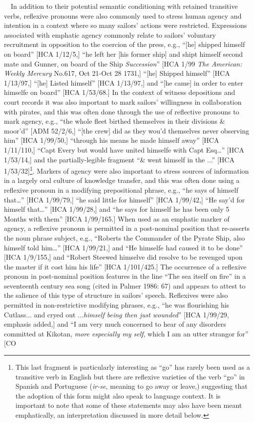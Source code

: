 \documentclass[12pt]{article}
\newenvironment{styleStandard}{\renewcommand\baselinestretch{1.0}\setlength\leftskip{0cm}\setlength\rightskip{0cm plus 1fil}\setlength\parindent{0cm}\setlength\parfillskip{0pt plus 1fil}\setlength\parskip{0in plus 1pt}\writerlistparindent\writerlistleftskip\leavevmode\normalfont\normalsize\writerlistlabel\ignorespaces}{\unskip\vspace{0in plus 1pt}\par}
\newcommand\writerlistleftskip{}
\newcommand\writerlistparindent{}
\newcommand\writerlistlabel{}
\begin{document}
\begin{styleStandard}
\ \ In addition to their potential semantic conditioning with retained transitive verbs, reflexive pronouns were also commonly used to stress human agency and intention in a context where so many sailors’ actions were restricted. Expressions associated with emphatic agency commonly relate to sailors’ voluntary recruitment in opposition to the coercion of the press, e.g., “[he] shipped himself on board” [HCA 1/12/5,] “he left her [his former ship] and shipt himself second mate and Gunner, on board of the Ship \textit{Succession}” [HCA 1/99 \textit{The American: Weekly Mercury} No.617, Oct 21-Oct 28 1731,] “[he] Shipped himself” [HCA 1/13/97,] “[he] Listed himself” [HCA 1/13/97,] and “[he came] in order to enter himselfe on board” [HCA 1/53/68.] In the context of witness depositions and court records it was also important to mark sailors’ willingness in collaboration with pirates, and this was often done through the use of reflective pronouns to mark agency, e.g., “the whole fleet birthed themselves in their divisions \& moor’d” [ADM 52/2/6,] “[the crew] did as they wou’d themselves never observing him” [HCA 1/99/50,] “through his means he made himself away” [HCA 1/11/110,] “Capt Every but would have united himselfe with Capt Esq…” [HCA 1/53/14,] and the partially-legible fragment “\& went himself in the ...” [HCA 1/53/32]\footnote{ This last fragment is particularly interesting as “go” has rarely been used as a transitive verb in English but there are reflexive varieties of the verb “go” in Spanish and Portuguese (\textit{ir-se,} meaning to go away or leave,) suggesting that the adoption of this form might also speak to language context. It is important to note that some of these statements may also have been meant emphatically, an interpretation discussed in more detail below. }. Markers of agency were also important to stress sources of information in a largely oral culture of knowledge transfer, and this was often done using a reflexive pronoun in a modifying prepositional phrase, e.g., “he says of himself that…” [HCA 1/99/79,] “he said little for himself” [HCA 1/99/42,] “He say’d for himself that…” [HCA 1/99/28,] and “he says for himself he has been only 5 Months with them” [HCA 1/99/165.] When used as an emphatic marker of agency, a reflexive pronoun is permitted in a post-nominal position that re-asserts the noun phrase subject, e.g., “Roberts the Commander of the Pyrate Ship, also himself told him…” [HCA 1/99/21,] and “He himselfe had caused it to be done” [HCA 1/9/155,] and “Robert Steewed himselve did resolve to be revenged upon the master if it cost him his life” [HCA 1/101/425.] The occurrence of a reflexive pronoun in post-nominal position features in the line “The sea itself on fire” in a seventeenth century sea song (cited in Palmer 1986: 67) and appears to attest to the salience of this type of structure in sailors’ speech. Reflexives were also permitted in non-restrictive modifying phrases, e.g., “he was flourishing his Cutlass... and cryed out ...\textit{himself being then just wounded}” [HCA 1/99/29, emphasis added,] and “I am very much concerned to hear of any disorders committed at Kikotan, \textit{more especially my self}, which I am an utter strangor for” [CO 
\end{styleStandard}
\end{document}
